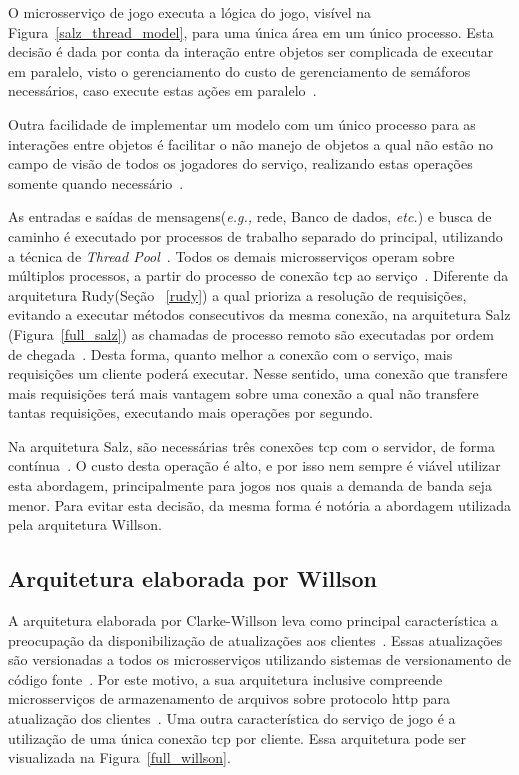 O microsserviço de jogo executa a lógica do jogo, visível na Figura~\ref{salz_thread_model}, para uma única área em um único processo.
%
Esta decisão é dada por conta da interação entre objetos ser complicada de executar em paralelo, visto o gerenciamento do custo de gerenciamento de semáforos necessários, caso execute estas ações em paralelo~\cite{salz_albion}.



Outra facilidade de implementar um modelo com um único processo para as interações entre objetos é facilitar o não manejo de objetos a qual não estão no campo de visão de todos os jogadores do serviço, realizando estas operações somente quando necessário~\cite{albion_online_unite, salz_albion}.


As entradas e saídas de mensagens(\textit{e.g.,} rede, Banco de dados, \textit{etc.}) e busca de caminho é executado por processos de trabalho separado do principal, utilizando a técnica de \textit{Thread Pool}~\cite{salz_albion, albion_online_unite, Ringler2014Dec}.
%
Todos os demais microsserviços operam sobre múltiplos processos, a partir do processo de conexão \ac{tcp} ao serviço~\cite{salz_albion}.
%
Diferente da arquitetura Rudy(Seção ~\ref{rudy}) a qual prioriza a resolução de requisições, evitando a executar métodos consecutivos da mesma conexão, na arquitetura Salz (Figura~\ref{full_salz}) as chamadas de processo remoto são executadas por ordem de chegada~\cite{salz_albion}.
%
Desta forma, quanto melhor a conexão com o serviço, mais requisições um cliente poderá executar.
%
Nesse sentido, uma conexão que transfere mais requisições terá mais vantagem sobre uma conexão a qual não transfere tantas requisições, executando mais operações por segundo.



Na arquitetura Salz, são necessárias três conexões \ac{tcp} com o servidor, de forma contínua~\cite{albion_online_unite}.
%
O custo desta operação é alto, e por isso nem sempre é viável utilizar esta abordagem, principalmente para jogos nos quais a demanda de banda seja menor.
%
Para evitar esta decisão, da mesma forma é notória a abordagem utilizada pela arquitetura Willson.



\subsection{Arquitetura elaborada por Willson}
\label{willson}


A arquitetura elaborada por Clarke-Willson leva como principal característica a preocupação da disponibilização de atualizações aos clientes~\cite{willson}.
%
Essas atualizações são versionadas a todos os microsserviços utilizando sistemas de versionamento de código fonte~\cite{stephenclarkewillson2017, willson}.
%
Por este motivo, a sua arquitetura inclusive compreende microsserviços de armazenamento de arquivos sobre protocolo \ac{http} para atualização dos clientes~\cite{stephenclarkewillson2017}.
%
Uma outra característica do serviço de jogo é a utilização de uma única conexão \ac{tcp} por cliente.
%
Essa arquitetura pode ser visualizada na Figura~\ref{full_willson}.


